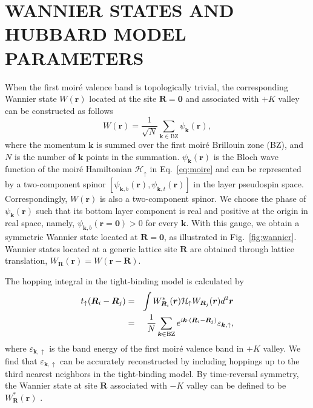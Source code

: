 \documentclass[aps,prx,floatfix,twocolumn]{revtex4-1}
\begin{document}
	\section{WANNIER STATES AND HUBBARD MODEL PARAMETERS}
	\label{appA}
	When the first moir\'e valence band is topologically trivial, the corresponding Wannier state $W(\bm{r})$ located at the site $\bm{R}=\bm{0}$ and associated with $+K$ valley can be constructed as follows
	\begin{equation}
	W(\bm{r})=\frac{1}{\sqrt{N}}\sum_{\bm{k}\in\text{BZ}}\psi_{\bm{k}}(\bm{r}),
	\end{equation}
	where the momentum $\bm{k}$ is summed over the first moir\'e Brillouin zone (BZ), and $N$ is the number of $\bm{k}$ points in the summation.  $\psi_{\bm{k}}(\bm{r})$ is the Bloch wave function of the moir\'e Hamiltonian $\mathcal{H}_\uparrow$ in Eq.~\eqref{eq:moire}  and can be represented by a two-component spinor $[\psi_{\bm{k},b}(\bm{r}), \psi_{\bm{k},t}(\bm{r})]$ in the layer pseudospin space. Correspondingly, $W(\bm{r})$  is also a two-component spinor. We choose the phase of $\psi_{\bm{k}}(\bm{r})$ such that its bottom layer component is real and positive at the origin in real space, namely, $\psi_{\bm{k},b}(\bm{r}=\bm{0}) > 0$ for every $\bm{k}$. With this gauge, we obtain a symmetric Wannier state located at $\bm{R}=\bm{0}$, as illustrated in Fig.~\ref{fig:wannier}. Wannier states located at a generic lattice site $\bm{R}$ are obtained through lattice translation, $W_{\bm{R}}(\bm{r})=W(\bm{r}-\bm{R})$.
	
	The hopping integral in the tight-binding model is calculated by
	\begin{eqnarray}
	t_\uparrow(\bm{R}_i-\bm{R}_j)&=&\int W_{\bm{R}_i}^*(\bm{r}) \mathcal{H}_\uparrow W_{\bm{R}_j}(\bm{r}) d^2\bm{r}\nonumber\\
	&=&\frac{1}{N}\sum_{\bm{k}\in\text{BZ}}e^{i\bm{k}\cdot\qty(\bm{R}_i-\bm{R}_j)}\varepsilon_{\bm{k},\uparrow},
	\end{eqnarray}
	where $ \varepsilon_{\bm{k},\uparrow} $ is the band energy of the first moir\'e valence band in $+K$ valley. We find that $ \varepsilon_{\bm{k},\uparrow} $ can be accurately reconstructed by including hoppings up to the third nearest neighbors in the tight-binding model.  By  time-reversal symmetry, the  Wannier state at site $\bm{R}$ associated with  $-K$ valley can be defined to be $ W_{\bm{R}}^*(\bm{r})$ .
	
	
\end{document}
